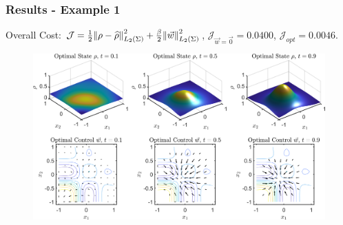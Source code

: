 \documentclass[aspectratio=169,xcolor=dvipsnames]{beamer}
\begin{document}
\begin{frame}
	\frametitle{Results - Example 1}
	\vspace{0.3cm}
	Overall Cost: $\mathcal J = \frac{1}{2}\norm{\rho- \widehat{\rho}}_{L_2(\Sigma)}^2 + \frac{\beta}{2} \norm{\vec{w}}_{L_2(\Sigma)}^2$, $\mathcal J_{\vec{w} = \vec 0} = 0.0400$, $\mathcal J_{opt} = 0.0046$.
	\begin{figure}
		\includegraphics[width=12cm]{Figure42D.png}
	\end{figure}
\end{frame}
\end{document}
